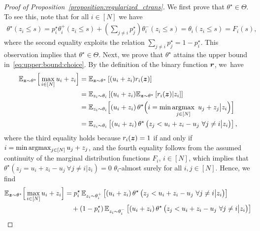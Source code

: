 \documentclass[11pt, a4paper, oneside, reqno]{article}
\begin{document}
\begin{proof}[Proof of Proposition~\ref{proposition:regularized_ctrans}]
    We first prove that $\theta^\star \in \Theta$. To see this, note that for all $i \in [N]$ we have
    \begin{align*}
        \textstyle
        \theta^\star (z_i \leq s)
        = p_i^\star \theta_i^+ (z_i \leq s) + ( \sum_{j \neq i} p_j^\star ) \theta_i^- (z_i \leq s)
        = \theta_i (z_i \leq s)
        = F_i(s),
    \end{align*}
    where the second equality exploits the relation $\sum_{j \neq i} p_j^\star = 1 - p_i^\star$. This observation implies that $\theta^\star \in \Theta$. Next, we prove that $\theta^\star$ attains the upper bound in~\eqref{eq:upper:bound:choice}. By the definition of the binary function $\boldsymbol r$, we~have
    \begin{align*}
        \mathbb{E}_{\boldsymbol z \sim \theta^\star} \Big[ \max\limits_{i \in [N]} u_i + z_{i} \Big] &=\mathbb{E}_{\boldsymbol z \sim \theta^\star} \left[ ( u_i + z_i) r_i(\boldsymbol z) \right] \\
        &= \mathbb{E}_{z_i \sim \theta_i} \left[ (u_i + z_i) \mathbb{E}_{\boldsymbol z \sim \theta^\star} \left[r_i(\boldsymbol z) | z_i \right] \right] \\
	    &= \mathbb{E}_{z_i \sim \theta_i} \Big[ ( u_i + z_i) \, \theta^\star \Big( i = \min \operatorname*{argmax}\limits_{j \in [N]} ~ u_j + z_j \big| z_i \Big) \Big] \\
	    &= \mathbb{E}_{z_i \sim \theta_i} \left[ ( u_i + z_i) \, \theta^\star \left( z_j < u_i + z_i - u_j~ \forall j \neq i \big| z_i  \right) \right],
    \end{align*}
    where the third equality holds because $r_i(\boldsymbol z)=1$ if and only if $i = \min \operatorname*{argmax}_{j \in [N]} u_j + z_j$, and the fourth equality follows from the assumed continuity of the marginal distribution functions $F_i$, $i\in[N]$, which implies that $\theta^\star ( z_j = u_i + z_i - u_j~ \forall j \neq i \big| z_i ) = 0$ $\theta_i$-almost surely for all $i,j\in[N]$. 
    Hence, we find
    \begin{subequations}
    \label{eq:both:exp}
    \begin{align}
        \EE_{\bs z \sim \theta^\star} \Big[ \max\limits_{i \in [N]} u_i + z_{i} \Big]
        &= p_i^\star\, \EE_{z_i \sim \theta_i^+} \left[ ( u_i + z_i) \, \theta^\star \left( z_j < u_i + z_i - u_j~ \forall j \neq i \big| z_i \right) \right] \notag \\
        &\quad + (1 - p_i^\star)\, \EE_{z_i \sim \theta_i^-} \left[ ( u_i + z_i) \, \theta^\star \left( z_j < u_i + z_i - u_j~ \forall j \neq i \big| z_i \right) \right] \notag \\

\end{align}
\end{subequations}
\end{proof}
\end{document}
